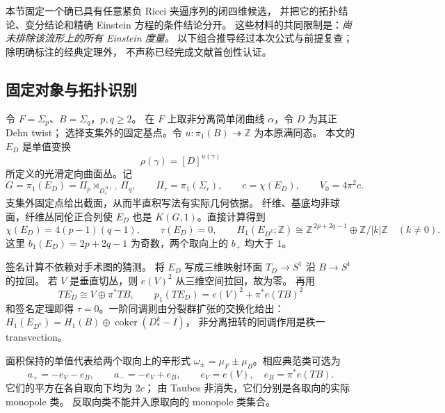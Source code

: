 \documentclass[UTF8,fontset=fandol,zihao=-4,oneside,openany]{ctexbook}
\theoremstyle{cjkplain}
\numberwithin{equation}{chapter}
\begin{document}
本节固定一个确已具有任意紧负 Ricci 夹逼序列的闭四维候选，
并把它的拓扑结论、变分结论和精确 Einstein 方程的条件结论分开。
这些材料的共同限制是：\emph{尚未排除该流形上的所有 Einstein 度量。}
以下组合推导经过本次公式与前提复查；除明确标注的经典定理外，
不声称已经完成文献首创性认证。

\subsection{固定对象与拓扑识别}
\label{BUNTOP:object}

令 \(F=\Sigma_p\)、\(B=\Sigma_q\)，\(p,q\ge2\)。
在 \(F\) 上取非分离简单闭曲线 \(\alpha\)，令 \(D\) 为其正 Dehn twist；
选择支集外的固定基点。令 \(u:\pi_1(B)\twoheadrightarrow\mathbb Z\) 为本原满同态。
本文的 \(E_D\) 是单值变换
\[
 \rho(\gamma)=[D]^{u(\gamma)}
\]
所定义的光滑定向曲面丛。记
\begin{equation}
 G=\pi_1(E_D)=\Pi_p\rtimes_{D_*^{\,u(\cdot)}}\Pi_q,\qquad
 \Pi_r=\pi_1(\Sigma_r),\qquad
 c=\chi(E_D),\qquad V_0=4\pi^2c .
 \label{BUNTOP:group}
\end{equation}
支集外固定点给出截面，从而半直积写法有实际几何依据。
纤维、基底均非球面，纤维丛同伦正合列使 \(E_D\) 也是
\(K(G,1)\)。直接计算得到
\begin{equation}
 \chi(E_D)=4(p-1)(q-1),\qquad
 \tau(E_D)=0,\qquad
 H_1(E_{D^k};\mathbb Z)
 \cong\mathbb Z^{\,2p+2q-1}\oplus\mathbb Z/|k|\mathbb Z
 \quad(k\ne0).
 \label{BUNTOP:invariants}
\end{equation}
这里 \(b_1(E_D)=2p+2q-1\) 为奇数，两个取向上的 \(b_+\) 均大于 \(1\)。

签名计算不依赖对手术图的猜测。
将 \(E_D\) 写成三维映射环面 \(T_D\to S^1\) 沿 \(B\to S^1\) 的拉回。
若 \(V\) 是垂直切丛，则 \(e(V)^2\) 从三维空间拉回，故为零。
再用
\[
 TE_D\cong V\oplus\pi^*TB,\qquad
 p_1(TE_D)=e(V)^2+\pi^*e(TB)^2
\]
和签名定理即得 \(\tau=0\)。一阶同调则由分裂群扩张的交换化给出：
\(H_1(E_{D^k})=H_1(B)\oplus\operatorname{coker}(D_*^k-I)\)，
非分离扭转的同调作用是秩一 transvection。

面积保持的单值代表给两个取向上的辛形式
\(\omega_\pm=\mu_F\pm\mu_B\)。相应典范类可选为
\begin{equation}
 a_+=-e_V-e_B,\qquad a_-=-e_V+e_B,\qquad
 e_V=e(V),\quad e_B=\pi^*e(TB).
 \label{BUNTOP:canonical}
\end{equation}
它们的平方在各自取向下均为 \(2c\)；
由 Taubes 非消失，它们分别是各取向的实际 monopole 类。
反取向类不能并入原取向的 monopole 类集合。
\end{document}
